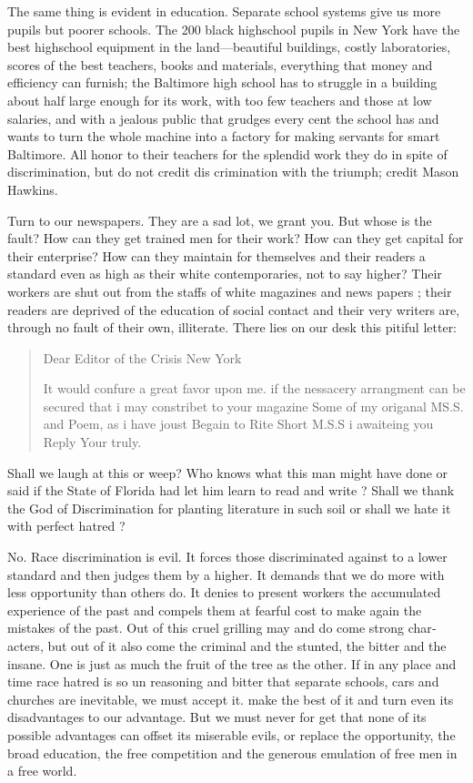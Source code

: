 \documentclass[letterpaper,10pt,english]{jupyterBook}
\begin{document}
\sphinxAtStartPar
The same thing is evident in education. Separate school systems give us more pupils but poorer schools. The 200 black high\sphinxhyphen{}school pupils in New York have the best high\sphinxhyphen{}school equipment in the land—beautiful buildings, costly laboratories, scores of the best teachers, books and materials, everything that money and efficiency can furnish; the Baltimore high school has to struggle in a building about half large enough for its work, with too few teachers and those at low salaries, and with a jealous public that grudges every cent the school has and wants to turn the whole machine into a factory for making servants for smart Baltimore. All honor to their teachers for the splendid work they do in spite of discrimination, but do not credit dis­ crimination with the triumph; credit Mason Hawkins.

\sphinxAtStartPar
Turn to our newspapers. They are a sad lot, we grant you. But whose is the fault? How can they get trained men for their work? How can they get capital for their enterprise? How can
they maintain for themselves and their readers a standard even as high as their white contemporaries, not to say higher? Their workers are shut out from the staffs of white magazines and news­ papers ; their readers are deprived of the education of social contact and their very writers are, through no fault of their own, illiterate. There lies on our desk this pitiful letter:
\begin{quote}

\sphinxAtStartPar
Dear Editor of the Crisis
New York

\sphinxAtStartPar
It would confure a great favor upon me. if the nessacery arrangment can be secured that i may constribet to your magazine Some of my origanal MS.S. and Poem, as i have joust Begain to Rite Short M.S.S i awaiteing you Reply
Your truly.
\end{quote}

\sphinxAtStartPar
Shall we laugh at this or weep? Who knows what this man might have done or said if the State of Florida had let him learn to read and write ? Shall we thank the God of Discrimination for planting literature in such soil or shall we hate it with perfect hatred ?

\sphinxAtStartPar
No. Race discrimination is evil. It forces those discriminated against to a lower standard and then judges them by a higher. It demands that we do more with less opportunity than others do. It denies to present workers the accumu­lated experience of the past and compels them at fearful cost to make again the mistakes of the past. Out of this cruel grilling may and do come strong char­acters, but out of it also come\sphinxhyphen{} the criminal and the stunted, the bitter and the insane. One is just as much the fruit of the tree as the other. If in any place and time race hatred is so un­ reasoning and bitter that separate
schools, cars and churches are inevita­ble, we must accept it. make the best of it and turn even its disadvantages to our advantage. But we must never for­ get that none of its possible advantages can offset its miserable evils, or replace the opportunity, the broad education, the free competition and the generous emul­ation of free men in a free world.
\end{document}
